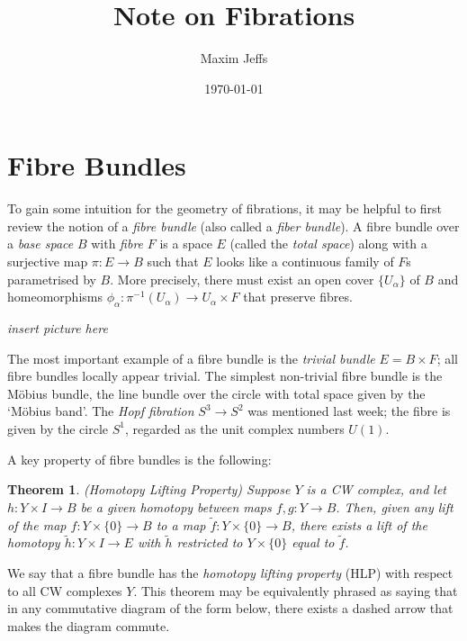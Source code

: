 \documentclass[11pt]{article}
\title{Note on Fibrations}
\author{Maxim Jeffs}
\date{\today}
\newtheorem{theorem}{Theorem}
\begin{document}
\maketitle

\section*{Fibre Bundles}

To gain some intuition for the geometry of fibrations, it may be helpful to first review the notion of a \textit{fibre bundle} (also called a \textit{fiber bundle}). A fibre bundle over a \textit{base space} $B$ with \textit{fibre} $F$ is a space $E$ (called the \textit{total space}) along with a surjective map $\pi: E \to B$ such that $E$ looks like a continuous family of $F$s parametrised by $B$. More precisely, there must exist an open cover $\{U_{\alpha}\}$ of $B$ and homeomorphisms $\phi_{\alpha} : \pi^{-1}(U_{\alpha}) \to U_{\alpha} \times F$ that preserve fibres. 

\begin{center}
\textit{insert picture here}
\end{center}

The most important example of a fibre bundle is the \textit{trivial bundle} $E = B \times F$; all fibre bundles locally appear trivial. The simplest non-trivial fibre bundle is the M\"obius bundle, the line bundle over the circle with total space given by the `M\"obius band'. The \textit{Hopf fibration} $S^3 \to S^2$ was mentioned last week; the fibre is given by the circle $S^1$, regarded as the unit complex numbers $U(1)$.

A key property of fibre bundles is the following:

\begin{theorem} 
(Homotopy Lifting Property) Suppose $Y$ is a CW complex, and let $h: Y \times I \to B$ be a given homotopy between maps $f,g: Y \to B$. Then, given any lift of the map $f: Y \times \{0\} \to B$ to a map $\tilde{f}: Y \times \{0\} \to B$, there exists a lift of the homotopy $\tilde{h}: Y \times I \to E$ with $\tilde{h}$ restricted to $Y \times \{0\}$ equal to $\tilde{f}$. 
\end{theorem}
We say that a fibre bundle has the \textit{homotopy lifting property} (HLP) with respect to all CW complexes $Y$. This theorem may be equivalently phrased as saying that in any commutative diagram of the form below, there exists a dashed arrow that makes the diagram commute.
\begin{center}
\end{center}
\end{document}
